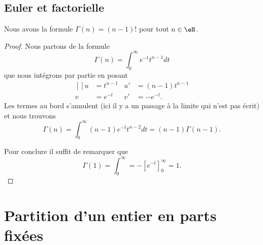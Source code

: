 \subsection{Euler et factorielle}

\begin{proposition}
    Nous avons la formule \( \Gamma(n)=(n-1)!\) pour tout \( n\in \eN\).
\end{proposition}

\begin{proof}
    Nous partons de la formule 
    \begin{equation}
        \Gamma(n)=\int_0^{\infty} e^{-t}t^{n-1}dt
    \end{equation}
    que nous intégrons par partie en posant
    \begin{equation}
        \begin{aligned}[]
            u&=t^{n-1}&u'&=(n-1)t^{n-1}\\
            v&= e^{-t}&v'&=- e^{-t}.
        \end{aligned}
    \end{equation}
    Les termes au bord s'annulent (ici il y a un passage à la limite qui n'est pas écrit) et nous trouvons
    \begin{equation}
        \Gamma(n)=\int_0^{\infty}(n-1) e^{-t}t^{n-2}dt=(n-1)\Gamma(n-1).
    \end{equation}
    
    Pour conclure il suffit de remarquer que
    \begin{equation}
        \Gamma(1)=\int_0^{\infty}=-[ e^{-t}]_0^{\infty}=1.
    \end{equation}
\end{proof}

\section{Partition d'un entier en parts fixées}


